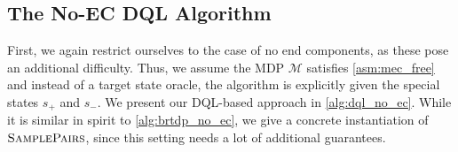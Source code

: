 \documentclass{theoretics}
\DeclareMathOperator*{\argmax}{arg\,max}
\newcommand{\MDP}{\mathcal{M}}
\newcommand{\States}{S}
\newcommand{\initialstate}{\hat{s}}
\DeclareMathOperator{\val}{\mathcal{V}}
\newcommand{\upperbound}{\mathsf{Up}}
\newcommand{\lowerbound}{\mathsf{Lo}}
\newcommand{\targetstate}{s_+}
\newcommand{\sinkstate}{s_-}
\newcommand{\samplepath}{\textsc{SamplePairs}}
\newcommand{\successor}{\mathsf{succ}}
\newcommand{\acc}{\texttt{acc}}
\newcommand{\visitcount}{\texttt{count}}
\newcommand{\learn}{\texttt{learn}}
\newcommand{\learnyes}{\texttt{yes}}
\newcommand{\algostep}{\mathsf{t}}
\newcommand{\algoepisode}{\mathsf{e}}
\newcommand{\umaxactions}{\mathsf{MaxA}}
\begin{document}
\subsection{The No-EC DQL Algorithm}

First, we again restrict ourselves to the case of no end components, as these pose an additional difficulty.
Thus, we assume the MDP $\MDP$ satisfies \cref{asm:mec_free} and instead of a target state oracle, the algorithm is explicitly given the special states $\targetstate$ and $\sinkstate$.
We present our DQL-based approach in \cref{alg:dql_no_ec}.
While it is similar in spirit to \cref{alg:brtdp_no_ec}, we give a concrete instantiation of $\samplepath$, since this setting needs a lot of additional guarantees.




\end{document}
